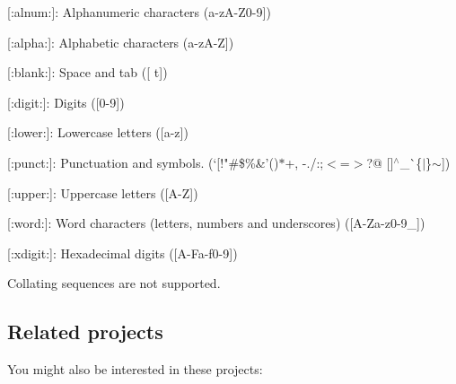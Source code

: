 \begin{DoxyItemize}
\item {\ttfamily \mbox{[}\+:alnum\+:\mbox{]}}\+: Alphanumeric characters ({\ttfamily a-\/z\+A-\/\+Z0-\/9\mbox{]}})
\item {\ttfamily \mbox{[}\+:alpha\+:\mbox{]}}\+: Alphabetic characters ({\ttfamily a-\/z\+A-\/Z\mbox{]}})
\item {\ttfamily \mbox{[}\+:blank\+:\mbox{]}}\+: Space and tab ({\ttfamily \mbox{[} t\mbox{]}})
\item {\ttfamily \mbox{[}\+:digit\+:\mbox{]}}\+: Digits ({\ttfamily \mbox{[}0-\/9\mbox{]}})
\item {\ttfamily \mbox{[}\+:lower\+:\mbox{]}}\+: Lowercase letters ({\ttfamily \mbox{[}a-\/z\mbox{]}})
\item {\ttfamily \mbox{[}\+:punct\+:\mbox{]}}\+: Punctuation and symbols. (`\mbox{[}!"\#\$\%\&'()$\ast$+, -\/./\+:;$<$=$>$?@ \mbox{[}\mbox{]}$^\wedge$\+\_\+\`{}{\ttfamily \{$\vert$\}$\sim$\mbox{]}})
\item {\ttfamily \mbox{[}\+:upper\+:\mbox{]}}\+: Uppercase letters ({\ttfamily \mbox{[}A-\/Z\mbox{]}})
\item {\ttfamily \mbox{[}\+:word\+:\mbox{]}}\+: Word characters (letters, numbers and underscores) ({\ttfamily \mbox{[}A-\/\+Za-\/z0-\/9\+\_\+\mbox{]}})
\item {\ttfamily \mbox{[}\+:xdigit\+:\mbox{]}}\+: Hexadecimal digits ({\ttfamily \mbox{[}A-\/\+Fa-\/f0-\/9\mbox{]}})
\end{DoxyItemize}

Collating sequences are not supported.

\subsection*{Related projects}

You might also be interested in these projects\+:


